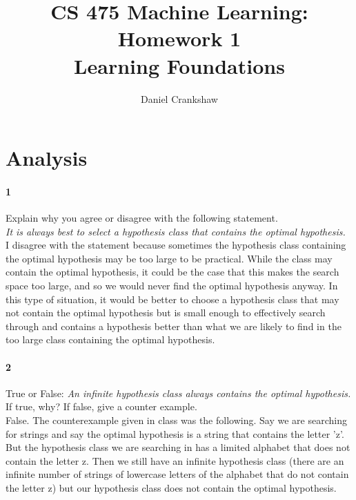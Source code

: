 \documentclass[11pt]{article}
\title{CS 475 Machine Learning: Homework 1\\Learning Foundations} \author{Daniel Crankshaw} \date{}
\begin{document}
 \large \maketitle \thispagestyle{headings}

\vspace{-.5in}

\section{Analysis}


\paragraph{1} Explain why you agree or disagree with the following statement.\\ {\it It is always
best to select a hypothesis class that contains the optimal hypothesis.}\\

I disagree with the statement because sometimes the hypothesis class containing the
optimal hypothesis may be too large to be practical. While the class may contain the
optimal hypothesis, it could be the case that this makes the search space too large,
and so we would never find the optimal hypothesis anyway. In this type of situation,
it would be better to choose a hypothesis class that may not contain the optimal
hypothesis but is small enough to effectively search through and contains a hypothesis
better than what we are likely to find in the too large class containing the optimal
hypothesis.

\paragraph{2} True or False: {\it An infinite hypothesis class always contains the
optimal hypothesis.} If true, why? If false, give a counter example.\\

False. The counterexample given in class was the following. Say we are searching for strings
and say the optimal hypothesis is a string that contains the letter 'z'. But the hypothesis class
we are searching in has a limited alphabet that does not contain the letter z. Then we still
have an infinite hypothesis class (there are an infinite number of strings of lowercase
letters of the alphabet that do not contain the letter z) but our hypothesis class does
not contain the optimal hypothesis.
\end{document}
